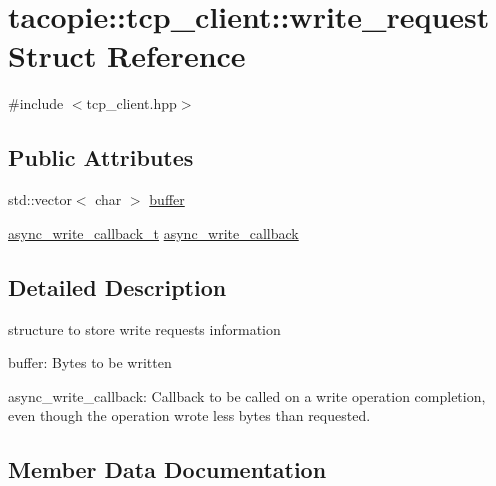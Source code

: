 \hypertarget{structtacopie_1_1tcp__client_1_1write__request}{}\section{tacopie\+:\+:tcp\+\_\+client\+:\+:write\+\_\+request Struct Reference}
\label{structtacopie_1_1tcp__client_1_1write__request}


{\ttfamily \#include $<$tcp\+\_\+client.\+hpp$>$}

\subsection*{Public Attributes}
\begin{DoxyCompactItemize}
\item 
std\+::vector$<$ char $>$ \hyperlink{structtacopie_1_1tcp__client_1_1write__request_a4ee0c159b630c14f81d6b6d7d4b4e826}{buffer}
\item 
\hyperlink{classtacopie_1_1tcp__client_ad48b8c8dff8a77490eb2e3e802c82b97}{async\+\_\+write\+\_\+callback\+\_\+t} \hyperlink{structtacopie_1_1tcp__client_1_1write__request_a04fd3e5484ba322d0112024bf8823623}{async\+\_\+write\+\_\+callback}
\end{DoxyCompactItemize}


\subsection{Detailed Description}
structure to store write requests information
\begin{DoxyItemize}
\item buffer\+: Bytes to be written
\item async\+\_\+write\+\_\+callback\+: Callback to be called on a write operation completion, even though the operation wrote less bytes than requested. 
\end{DoxyItemize}

\subsection{Member Data Documentation}
\mbox{\label{structtacopie_1_1tcp__client_1_1write__request_a04fd3e5484ba322d0112024bf8823623}} 
